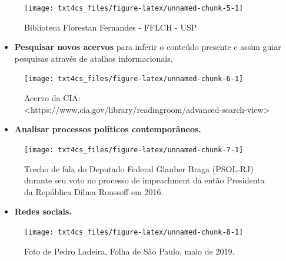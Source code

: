 \documentclass[]{book}
\providecommand{\tightlist}{%
  \setlength{\itemsep}{0pt}\setlength{\parskip}{0pt}}
\begin{document}
\begin{figure}

{\centering \texttt{[image: txt4cs\_files/figure-latex/unnamed-chunk-5-1]} 

}

\caption{Biblioteca Florestan Fernandes - FFLCH - USP}\label{fig:unnamed-chunk-5}
\end{figure}

\begin{itemize}
\tightlist
\item
  \textbf{Pesquisar novos acervos} para inferir o conteúdo presente e assim guiar pesquisas através de atalhos informacionais.
\end{itemize}

\begin{figure}

{\centering \texttt{[image: txt4cs\_files/figure-latex/unnamed-chunk-6-1]} 

}

\caption{Acervo da CIA: <https://www.cia.gov/library/readingroom/advanced-search-view>}\label{fig:unnamed-chunk-6}
\end{figure}

\begin{itemize}
\tightlist
\item
  \textbf{Analisar processos políticos contemporâneos.}
\end{itemize}

\begin{figure}

{\centering \texttt{[image: txt4cs\_files/figure-latex/unnamed-chunk-7-1]} 

}

\caption{Trecho de fala do Deputado Federal Glauber Braga (PSOL-RJ) durante seu voto no processo de impeachment da então Presidenta da República Dilma Rousseff em 2016.}\label{fig:unnamed-chunk-7}
\end{figure}

\begin{itemize}
\tightlist
\item
  \textbf{Redes sociais.}
\end{itemize}

\begin{figure}

{\centering \texttt{[image: txt4cs\_files/figure-latex/unnamed-chunk-8-1]} 

}

\caption{Foto de Pedro Ladeira, Folha de São Paulo, maio de 2019.}\label{fig:unnamed-chunk-8}
\end{figure}
\end{document}
